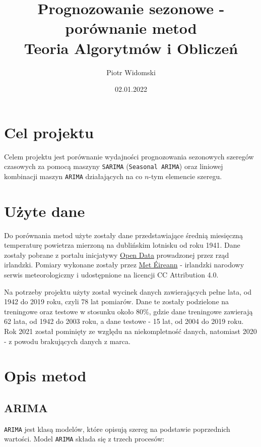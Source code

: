 \documentclass[12pt]{article}
\title{Prognozowanie sezonowe - porównanie metod \\
    \large Teoria Algorytmów i Obliczeń \\}
\author{Piotr Widomski}
\date{02.01.2022}
\begin{document}
\maketitle

\section{Cel projektu}

Celem projektu jest porównanie wydajności prognozowania sezonowych szeregów czasowych za pomocą maszyny \texttt{SARIMA} (\texttt{Seasonal ARIMA}) oraz liniowej kombinacji maszyn \texttt{ARIMA} działających na co $n$-tym elemencie szeregu.

\section{Użyte dane}

Do porównania metod użyte zostały dane przedstawiające średnią miesięczną temperaturę powietrza mierzoną na dublińskim lotnisku od roku 1941. Dane zostały pobrane z portalu inicjatywy \href{https://data.gov.ie/dataset/dublin-airport-monthly-data?package_type=dataset}{Open Data} prowadzonej przez rząd irlandzki. Pomiary wykonane zostały przez \href{https://www.met.ie/}{Met Éireann} - irlandzki narodowy serwis meteorologiczny i udostępnione na licencji CC Attribution 4.0.

Na potrzeby projektu użyty został wycinek danych zawierających pełne lata, od 1942 do 2019 roku, czyli 78 lat pomiarów. Dane te zostały podzielone na treningowe oraz testowe w stosunku około $80\%$, gdzie dane treningowe zawierają 62 lata, od 1942 do 2003 roku, a dane testowe - 15 lat, od 2004 do 2019 roku. Rok 2021 został pominięty ze względu na niekompletność danych, natomiast 2020 - z powodu brakujących danych z marca.

\section{Opis metod}

\subsection{ARIMA}

\texttt{ARIMA} jest klasą modelów, które opisują szereg na podstawie poprzednich wartości. Model \texttt{ARIMA} składa się z trzech procesów:
\end{document}
